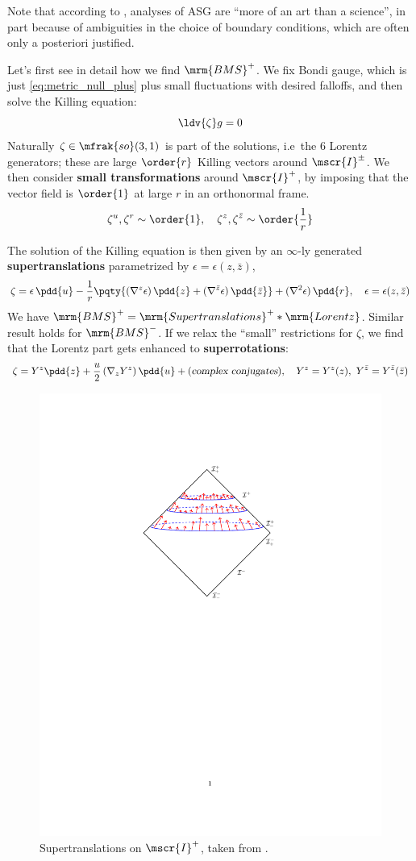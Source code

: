 \documentclass[a4paper
	,10pt
]{article}
\begin{document}
	Note that according to \cite{Strominger:2017zoo}, analyses of ASG are ``more of an art than a science'', in part because of ambiguities in the choice of boundary conditions, which are often only a posteriori justified. 
	
	Let's first see in detail how we find $\mrm{BMS}^+$. We fix Bondi gauge, which is just \eqref{eq:metric_null_plus} plus small fluctuations with desired falloffs, and then solve the Killing equation:
	\begin{equation}
		\ldv{\zeta} g = 0
	\end{equation}
	Naturally $\zeta \in \mfrak{so}(3,1)$ is part of the solutions, i.e~the 6 Lorentz generators; these are large $\order{r}$ Killing vectors around $\mscr{I}^\pm$. 
	We then consider \textbf{small transformations} around $\mscr{I}^+$, by imposing that the vector field is $\order{1}$ at large $r$ in an orthonormal frame. 
	\begin{equation}
		\zeta^u,\zeta^r
		\sim \order{1},
	\quad
		\zeta^z,\zeta^{\bar{z}}
		\sim \order{\frac{1}{r}}
	\end{equation}
	
	The solution of the Killing equation is then given by an $\infty$-ly generated \textbf{supertranslations} parametrized by $\epsilon = \epsilon(z,\bar{z})$,
	\begin{equation}
		\zeta
		= \epsilon\,\pdd{u}
		- \frac{1}{r} \pqty{
			(\nabla^z \epsilon)\,\pdd{z}
			+ (\nabla^{\bar{z}} \epsilon)\,\pdd{\bar{z}}
		} + (\nabla^2 \epsilon)\,\pdd{r},
	\quad
		\epsilon = \epsilon(z,\bar{z})
	\end{equation}
	We have $\mrm{BMS}^+ = \mrm{Supertranslations}^+ * \mrm{Lorentz}$. Similar result holds for $\mrm{BMS}^-$. If we relax the ``small'' restrictions for $\zeta$, we find that the Lorentz part gets enhanced to \textbf{superrotations}:
	\begin{equation}
		\zeta
		= Y^z \pdd{z}
			+ \frac{u}{2}\,(\nabla_z Y^z)\,\pdd{u}
			+ (\textsl{complex conjugates}),
	\quad
		Y^z = Y^z(z),\ %
		Y^{\bar{z}} = Y^{\bar{z}}(\bar{z})
	\end{equation}
	
	\begin{figure}[!t]
	\centering
	\includegraphics[width=.45\linewidth]{img/supertranslation.pdf}
	\caption[Supertranslations on $\mscr{I}^+$]{
		Supertranslations on $\mscr{I}^+$, taken from \cite{Strominger:2017zoo}.
	}
	\end{figure}
	
\end{document}
